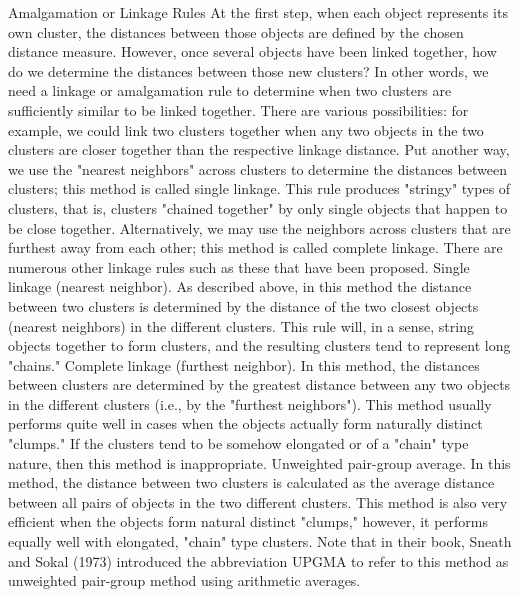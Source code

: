 Amalgamation or Linkage Rules
At the first step, when each object represents its own cluster, the distances between those objects are defined by the chosen distance measure. However, once several objects have been linked together, how do we determine the distances between those new clusters? In other words, we need a linkage or amalgamation rule to determine when two clusters are sufficiently similar to be linked together. There are various possibilities: for example, we could link two clusters together when any two objects in the two clusters are closer together than the respective linkage distance. Put another way, we use the "nearest neighbors" across clusters to determine the distances between clusters; this method is called single linkage. This rule produces "stringy" types of clusters, that is, clusters "chained together" by only single objects that happen to be close together. Alternatively, we may use the neighbors across clusters that are furthest away from each other; this method is called complete linkage. There are numerous other linkage rules such as these that have been proposed.
Single linkage (nearest neighbor). As described above, in this method the distance between two clusters is determined by the distance of the two closest objects (nearest neighbors) in the different clusters. This rule will, in a sense, string objects together to form clusters, and the resulting clusters tend to represent long "chains."
Complete linkage (furthest neighbor). In this method, the distances between clusters are determined by the greatest distance between any two objects in the different clusters (i.e., by the "furthest neighbors"). This method usually performs quite well in cases when the objects actually form naturally distinct "clumps." If the clusters tend to be somehow elongated or of a "chain" type nature, then this method is inappropriate.
Unweighted pair-group average. In this method, the distance between two clusters is calculated as the average distance between all pairs of objects in the two different clusters. This method is also very efficient when the objects form natural distinct "clumps," however, it performs equally well with elongated, "chain" type clusters. Note that in their book, Sneath and Sokal (1973) introduced the abbreviation UPGMA to refer to this method as unweighted pair-group method using arithmetic averages.
